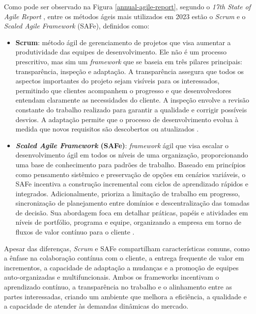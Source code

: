 \documentclass[
	12pt,
	openright,
	twoside,
	a4paper,
	english,
	brazil
	]{abntex2}
\begin{document}
Como pode ser observado na Figura \ref{annual-agile-report}, segundo o \textit{17th State of Agile Report} \cite{17_agile_report}, entre os métodos ágeis mais utilizados em 2023 estão o \textit{Scrum} e o \textit{Scaled Agile Framework} (SAFe), definidos como:
\begin{itemize}
  \item \textbf{Scrum}: método ágil de gerenciamento de projetos que visa aumentar a produtividade das equipes de desenvolvimento. Ele não é um processo prescritivo, mas sim um \textit{framework} que se baseia em três pilares principais: transparência, inspeção e adaptação. A transparência assegura que todos os aspectos importantes do projeto sejam visíveis para os interessados, permitindo que clientes acompanhem o progresso e que desenvolvedores entendam claramente as necessidades do cliente. A inspeção envolve a revisão constante do trabalho realizado para garantir a qualidade e corrigir possíveis desvios. A adaptação permite que o processo de desenvolvimento evolua à medida que novos requisitos são descobertos ou atualizados \cite{wazlawick2019}.
  \item \textbf{\textit{Scaled Agile Framework} (SAFe)}: \textit{framework} ágil que visa escalar o desenvolvimento ágil em todos os níveis de uma organização, proporcionando uma base de conhecimento para padrões de trabalho. Baseado em princípios como pensamento sistêmico e preservação de opções em cenários variáveis, o SAFe incentiva a construção incremental com ciclos de aprendizado rápidos e integrados. Adicionalmente, prioriza a limitação de trabalho em progresso, sincronização de planejamento entre domínios e descentralização das tomadas de decisão. Sua abordagem foca em detalhar práticas, papéis e atividades em níveis de portfólio, programa e equipe, organizando a empresa em torno de fluxos de valor contínuo para o cliente \cite{AgileGuide}.
\end{itemize}

Apesar das diferenças, \textit{Scrum} e SAFe compartilham características comuns, como a ênfase na colaboração contínua com o cliente, a entrega frequente de valor em incrementos, a capacidade de adaptação a mudanças e a promoção de equipes auto-organizadas e multifuncionais. Ambos os frameworks incentivam o aprendizado contínuo, a transparência no trabalho e o alinhamento entre as partes interessadas, criando um ambiente que melhora a eficiência, a qualidade e a capacidade de atender às demandas dinâmicas do mercado.

\end{document}
